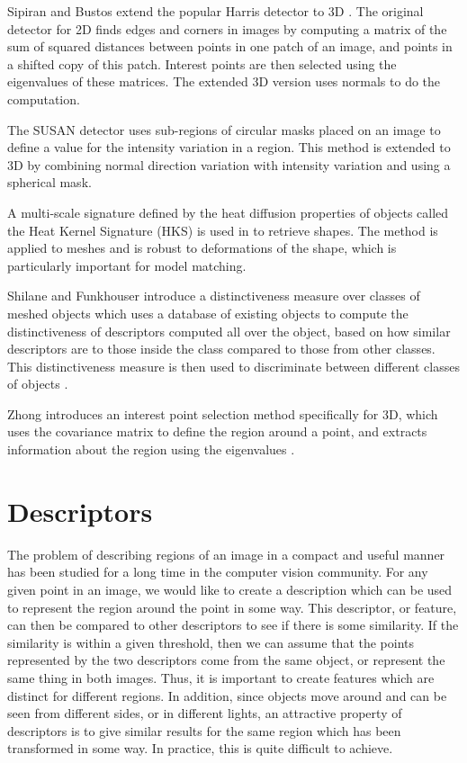 \documentclass[11pt,a4paper]{kth-mag}
\begin{document}
Sipiran and Bustos extend the popular Harris detector \cite{harris1988combined}
to 3D \cite{sipiran2011harris}. The original detector for 2D finds edges and
corners in images by computing a matrix of the sum of squared distances between
points in one patch of an image, and points in a shifted copy of this patch.
Interest points are then selected using the eigenvalues of these matrices. The
extended 3D version uses normals to do the computation.

The SUSAN detector \cite{smith1997susan} uses sub-regions of circular masks
placed on an image to define a value for the intensity variation in a region.
This method is extended to 3D by combining normal direction variation with
intensity variation and using a spherical mask.
 
A multi-scale signature defined by the heat diffusion properties of objects 
called the Heat Kernel Signature (HKS) \cite{sun2009concise} is used in
\cite{ovsjanikov2009shape} to retrieve shapes. The method is applied to meshes
and is robust to deformations of the shape, which is particularly important for
model matching.

Shilane and Funkhouser introduce a distinctiveness measure over classes of
meshed objects which uses a database of existing objects to compute the
distinctiveness of descriptors computed all over the object, based on how
similar descriptors are to those inside the class compared to those from other
classes. This distinctiveness measure is then used to discriminate between
different classes of objects \cite{shilane2007distinctive}.

Zhong introduces an interest point selection method specifically for 3D, which
uses the covariance matrix to define the region around a point, and extracts
information about the region using the eigenvalues \cite{zhong2009intrinsic}.

\section{Descriptors}
The problem of describing regions of an image in a compact and useful manner has
been studied for a long time in the computer vision community. For any given
point in an image, we would like to create a description which can be used to
represent the region around the point in some way. This descriptor, or feature,
can then be compared to other descriptors to see if there is some similarity. If
the similarity is within a given threshold, then we can assume that the points
represented by the two descriptors come from the same object, or represent the
same thing in both images. Thus, it is important to create features which are
distinct for different regions. In addition, since objects move around and can
be seen from different sides, or in different lights, an attractive property of
descriptors is to give similar results for the same region which has been
transformed in some way. In practice, this is quite difficult to achieve.
\end{document}
